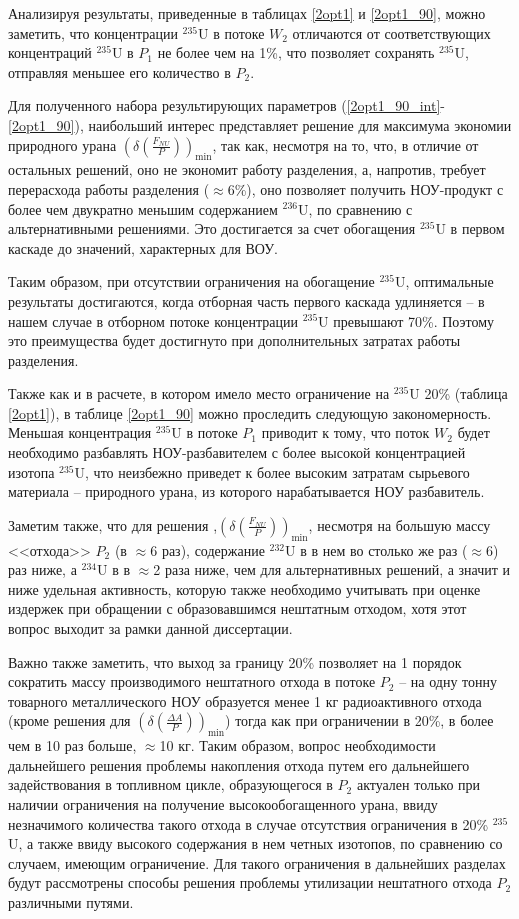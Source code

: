 Анализируя результаты, приведенные в таблицах \ref{2opt1} и \ref{2opt1_90}, можно заметить, что концентрации $^{235}$U в потоке $W_2$ отличаются от соответствующих концентраций $^{235}$U в  $P_1$ не более чем на 1\%, что позволяет сохранять $^{235}$U, отправляя меньшее его количество в $P_2$.

Для полученного набора результирующих параметров (\ref{2opt1_90_int}-\ref{2opt1_90}), наибольший интерес представляет решение для максимума экономии природного урана $(\delta(\frac{F_{NU}}{P}))_\text{min}$, так как, несмотря на то, что, в отличие от остальных решений, оно не экономит работу разделения, а, напротив, требует перерасхода работы разделения ($\approx$6\%), оно позволяет получить НОУ-продукт с более чем двукратно меньшим содержанием $^{236}$U, по сравнению с альтернативными решениями. Это достигается за счет обогащения $^{235}$U в первом каскаде до значений, характерных для ВОУ.

Таким образом, при отсутствии ограничения на обогащение $^{235}$U, оптимальные результаты достигаются, когда отборная часть первого каскада удлиняется -- в нашем случае в отборном потоке концентрации $^{235}$U превышают 70\%. Поэтому это преимущества будет достигнуто при дополнительных затратах работы разделения.

Также как и в расчете, в котором имело место ограничение на $^{235}$U 20\% (таблица \ref{2opt1}), в таблице \ref{2opt1_90} можно проследить следующую закономерность. Меньшая концентрация $^{235}$U в потоке $P_{1}$ приводит к тому, что поток $W_{2}$ будет необходимо разбавлять НОУ-разбавителем с более высокой концентрацией изотопа $^{235}$U, что неизбежно приведет к более высоким затратам сырьевого материала -- природного урана, из которого нарабатывается НОУ разбавитель.

Заметим также, что для решения ,$(\delta(\frac{F_{NU}}{P}))_\text{min}$, несмотря на большую массу <<отхода>> $P_{2}$ (в $\approx$6 раз), содержание $^{232}$U в в нем во столько же раз ($\approx$6) раз ниже, а $^{234}$U в в $\approx$2 раза ниже, чем для альтернативных решений, а значит и ниже удельная активность, которую также необходимо учитывать при оценке издержек при обращении с образовавшимся нештатным отходом, хотя этот вопрос выходит за рамки данной диссертации.

Важно также заметить, что выход за границу 20\% позволяет на 1 порядок сократить массу производимого нештатного отхода в потоке $P_{2}$ -- на одну тонну товарного металлического НОУ образуется менее 1 кг радиоактивного отхода (кроме решения для $(\delta(\frac{\Delta A}{P}))_\text{min}$) тогда как при ограничении в 20\%, в более чем в 10 раз больше, $\approx$10 кг. Таким образом, вопрос необходимости дальнейшего решения проблемы накопления отхода путем его дальнейшего задействования в топливном цикле, образующегося в $P_{2}$ актуален только при наличии ограничения на получение высокообогащенного урана, ввиду незначимого количества такого отхода в случае отсутствия ограничения в 20\% $^{235}$U, а также ввиду высокого содержания в нем четных изотопов, по сравнению со случаем, имеющим ограничение. Для такого ограничения в дальнейших разделах будут рассмотрены способы решения проблемы утилизации нештатного отхода $P_{2}$ различными путями. 



